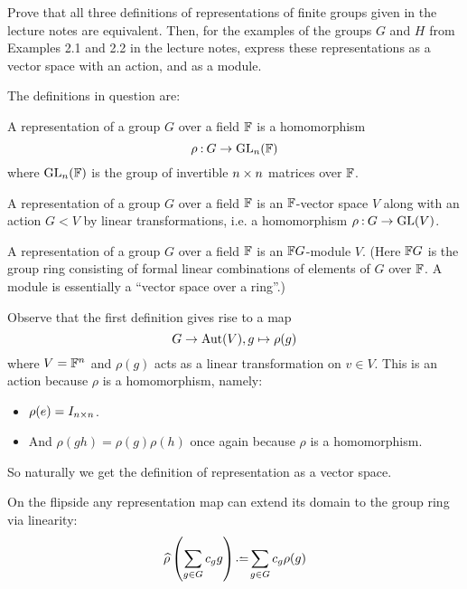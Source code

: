 \documentclass[12pt]{memoir}
\begin{document}
\begin{Ej}[Exercise 1]
    Prove that all three definitions of representations of finite groups given in the lecture notes are equivalent. Then, for the examples of the groups $G$ and $H$ from Examples 2.1 and 2.2 in the lecture notes, express these representations as a vector space with an action, and as a module.
\end{Ej}

The definitions in question are:

\begin{Def}
A representation of a group $G$ over a field $\mathbb{F}$ is a homomorphism 
$$\rho\mathbin{:} G\to\mathrm{GL}_n(\mathbb{F})$$
where $\mathrm{GL}_n(\mathbb{F})$ is the group of invertible $n\times n$ matrices over $\mathbb{F}$.
\end{Def}

\begin{Def}
A representation of a group $G$ over a field $\mathbb{F}$ is an $\mathbb{F}$-vector space $V$ along with an action $G\lt V$ by linear transformations, i.e. a homomorphism $\rho\mathbin{:} G\to\mathrm{GL}(V)$.
\end{Def}

\begin{Def}
A representation of a group $G$ over a field $\mathbb{F}$ is an $\mathbb{F} G$-module $V$. (Here $\mathbb{F} G$ is the group ring consisting of formal linear combinations of elements of $G$ over $\mathbb{F}$. A module is essentially a ``vector space over a ring''.)
\end{Def}

\begin{ptcbr}
Observe that the first definition gives rise to a map 
$$G\to\operatorname{Aut}(V),g\mapsto\rho(g)$$
where $V=\mathbb{F}^n$ and $\rho(g)$ acts as a linear transformation on $v\in V$. This is an action because $\rho$ is a homomorphism, namely:
\begin{itemize}
    \item $\rho(e)=I_{n\times n}$.
    \item And $\rho(gh)=\rho(g)\rho(h)$ once again because $\rho$ is a homomorphism.
\end{itemize}
So naturally we get the definition of representation as a vector space.\par 
On the flipside any representation map can extend its domain to the group ring via linearity:
$$\wh{\rho}\left(\sum_{g\in G}c_gg\right)\defeq \sum_{g\in G}c_g\rho(g)$$
\end{ptcbr}
\end{document}
